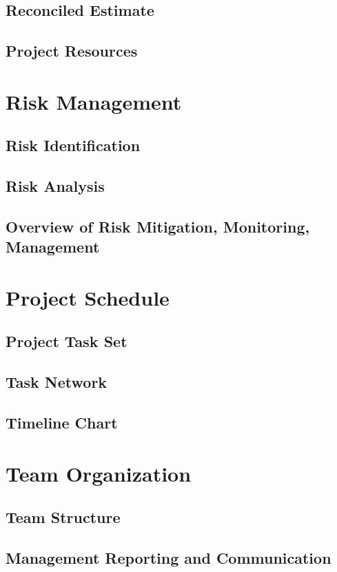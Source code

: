 \documentclass[oneside,a4paper,12pt]{report}
\begin{document}
\subsection{Reconciled Estimate}
\subsection{Project Resources}

\section{Risk Management}
\subsection{Risk Identification}
\subsection{Risk Analysis}
\subsection{Overview of Risk Mitigation, Monitoring, Management}


\section{Project Schedule}
\subsection{Project Task Set}
\subsection{Task Network}
\subsection{Timeline Chart}

\section{Team Organization}
\subsection{Team Structure}
\subsection{Management Reporting and Communication}
\end{document}
